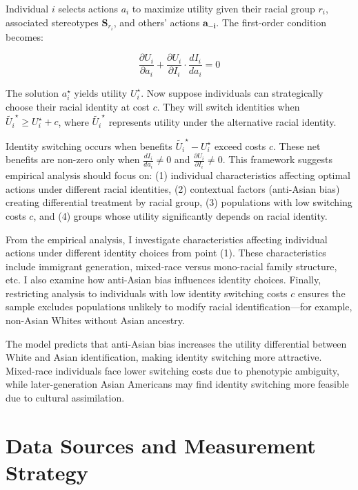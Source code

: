 Individual $i$ selects actions $a_i$ to maximize utility given their racial group $r_i$, associated stereotypes $\pmb{S}_{r_{i}}$, and others' actions $\pmb{a_{-i}}$. The first-order condition becomes:

\begin{equation}
\frac{\partial U_i}{\partial a_i} + \frac{\partial U_i}{\partial I_i} \cdot \frac{d I_i}{d a_i} = 0\label{eq:foc}
\end{equation}

The solution $a_{i}^{\star}$ yields utility $U_{i}^{\star}$. Now suppose individuals can strategically choose their racial identity at cost $c$. They will switch identities when $\tilde{U_{i}}^{\star} \geq U_{i}^{\star} + c$, where $\tilde{U_{i}}^{\star}$ represents utility under the alternative racial identity.

Identity switching occurs when benefits $\tilde{U_{i}}^{\star} - U_{i}^{\star}$ exceed costs $c$. These net benefits are non-zero only when $\frac{d I_i}{d a_i} \neq 0$ and $\frac{\partial U_i}{\partial I_i} \neq 0$. This framework suggests empirical analysis should focus on: (1) individual characteristics affecting optimal actions under different racial identities, (2) contextual factors (anti-Asian bias) creating differential treatment by racial group, (3) populations with low switching costs $c$, and (4) groups whose utility significantly depends on racial identity.

From the empirical analysis, I investigate characteristics affecting individual actions under different identity choices from point (1). These characteristics include immigrant generation, mixed-race versus mono-racial family structure, etc. I also examine how anti-Asian bias influences identity choices. Finally, restricting analysis to individuals with low identity switching costs $c$ ensures the sample excludes populations unlikely to modify racial identification—for example, non-Asian Whites without Asian ancestry.

The model predicts that anti-Asian bias increases the utility differential between White and Asian identification, making identity switching more attractive. Mixed-race individuals face lower switching costs due to phenotypic ambiguity, while later-generation Asian Americans may find identity switching more feasible due to cultural assimilation.

\section{Data Sources and Measurement Strategy}\label{sec:data}

